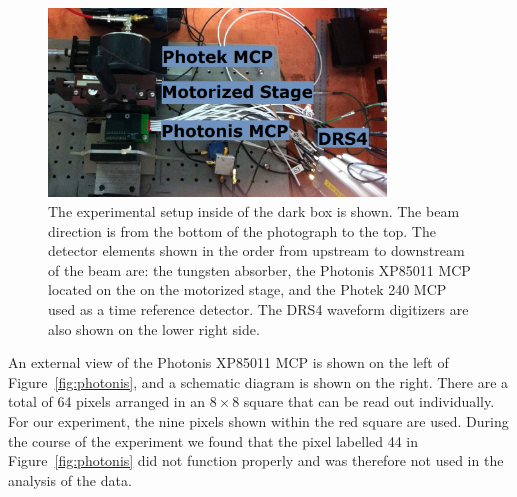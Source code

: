 \documentclass[12pt]{article}
\begin{document}
{\begin{figure}[htbp]
	\centering
	\includegraphics[width=0.8\textwidth]{Images/setup/setup.png}
	\caption{ The experimental setup inside of the dark box is shown. The beam
direction is from the bottom of the photograph to the top. The detector elements
shown in the order from upstream to downstream of the beam are: the tungsten
absorber, the Photonis XP85011 MCP located on the on the motorized stage, and
the Photek 240 MCP used as a time reference detector. The DRS4 waveform
digitizers are also shown on the lower right side.}
	\label{fig:setup}
\end{figure}


An external view of the Photonis XP85011 MCP is shown on the left of
Figure~\ref{fig:photonis}, and a schematic diagram is shown on the right. There
are a total of 64 pixels arranged in an $8\times8$ square that can be read out
individually. For our experiment, the nine pixels shown within the red square
are used. During the course of the experiment we found that the pixel labelled
44 in Figure~\ref{fig:photonis} did not function properly and was therefore not 
used in the analysis of the data.

}
\end{document}
